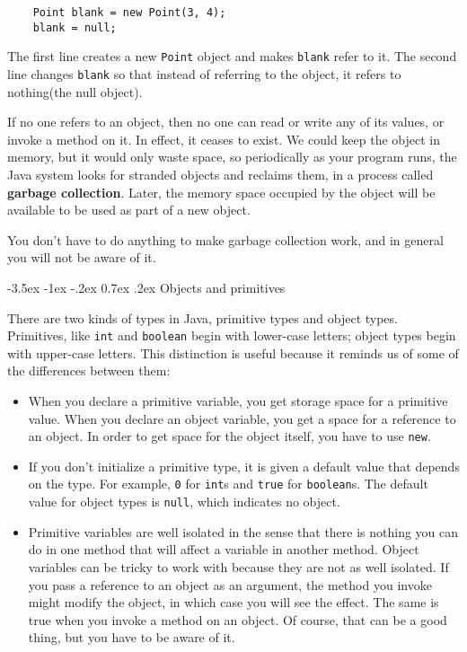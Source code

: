 \documentclass{book}
\makeatletter
\renewcommand{\section}{\@startsection 
    {section} {1} {0mm}%
    {-3.5ex \@plus -1ex \@minus -.2ex}%
    {0.7ex \@plus.2ex}%
    {\normalfont\Large\bfseries}}
\newcommand{\beforefig}{\vspace{1.3\parskip}}
\newcommand{\afterfig}{\vspace{-0.2\parskip}}
\newcommand{\myfig}[1]{
    \beforefig
    \centerline{\epsfig{#1,scale=0.8}}
    \afterfig
}
\makeatother
\begin{document}
\begin{verbatim}
    Point blank = new Point(3, 4);
    blank = null;
\end{verbatim}
%
The first line creates a new {\tt Point} object and makes
{\tt blank} refer to it.  The second line changes {\tt blank}
so that instead of referring to the object, it refers to
nothing(the null object).


\myfig{figure=figs/reference3.eps}


If no one refers to an object, then no one can read or write any of
its values, or invoke a method on it.  In effect, it ceases to exist.
We could keep the object in memory, but it would only waste space, so
periodically as your program runs, the Java system looks for stranded
objects and reclaims them, in a process called {\bf garbage
collection}.  Later, the memory space occupied by the object will
be available to be used as part of a new object.

You don't have to do anything to make garbage collection work,
and in general you will not be aware of it.

\section {Objects and primitives}

There are two kinds of types in Java, primitive types and
object types.  Primitives, like {\tt int} and {\tt boolean}
begin with lower-case letters; object types begin with
upper-case letters.  This distinction is useful because it
reminds us of some of the differences between them:

\begin{itemize}

\item When you declare a primitive variable, you get storage
space for a primitive value.  When you declare an object variable, you
get a space for a reference to an object.  In order to get space for
the object itself, you have to use {\tt new}.

\item If you don't initialize a primitive type, it is given
a default value that depends on the type.  For example,
{\tt 0} for {\tt int}s and {\tt true} for {\tt boolean}s.
The default value for object types is {\tt null}, which indicates
no object.

\item Primitive variables are well isolated in the sense that there is
nothing you can do in one method that will affect a variable in
another method.  Object variables can be tricky to work with because
they are not as well isolated.  If you pass a reference to an object
as an argument, the method you invoke might modify the object, in which
case you will see the effect.  The same is true when you invoke a
method on an object.  Of course, that can be a good thing, but you
have to be aware of it.

\end{itemize}
\end{document}
